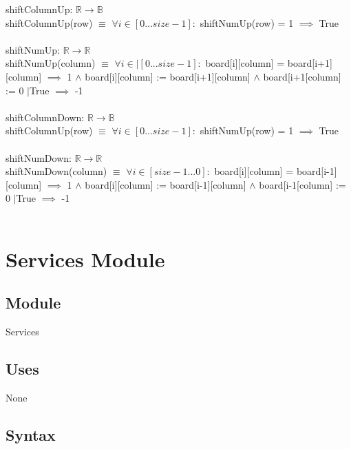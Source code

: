 \documentclass[12pt]{article}
\begin{document}
\noindent shiftColumnUp: $\mathbb{R} \rightarrow \mathbb{B}$\\
shiftColumnUp(row) $\equiv$ $\forall i \in [0...size-1]:$ shiftNumUp(row) = 1 $\implies$ True\\\\

\noindent shiftNumUp:  $\mathbb{R} \rightarrow \mathbb{R}$\\
shiftNumUp(column) $\equiv$ $\forall i \in |[0...size-1]:$ board[i][column] = board[i+1][column] $\implies$ 1 $\land$ board[i][column] := board[i+1][column] $\land$ board[i+1[column] := 0 $|$True $\implies$ -1 \\\\

\noindent shiftColumnDown: $\mathbb{R} \rightarrow \mathbb{B}$\\
shiftColumnUp(row) $\equiv$ $\forall i \in [0...size-1]:$ shiftNumUp(row) = 1 $\implies$ True \\\\

\noindent shiftNumDown:  $\mathbb{R} \rightarrow \mathbb{R}$\\
shiftNumDown(column) $\equiv$ $\forall i \in [size-1...0]:$ board[i][column] = board[i-1][column] $\implies$ 1 $\land$ board[i][column] := board[i-1][column] $\land$ board[i-1[column] := 0 $|$True $\implies$ -1 \\\\



\newpage

\section* {Services Module}

\subsection*{Module}

Services

\subsection* {Uses}

None

\subsection* {Syntax}
\end{document}

